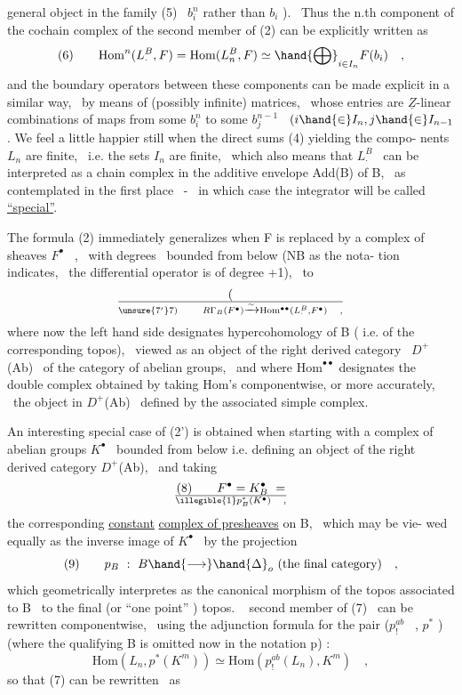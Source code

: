general object in the family (5) \ $b_i^n$ rather than $b_i$ ). \ Thus the n.th
component of the cochain complex of the second member of (2) can be
explicitly written as
\[ (6) \qquad \mathrm{Hom}^n(L_\cdot^B,F) = \mathrm{Hom}(L_n^B,F) \simeq \hand{\bigoplus}_{i\in I_n} F(b_i) \quad , \]
and the boundary operators between these components can be made explicit
in a similar way, \ by means of (possibly infinite) matrices, \ whose entries
are $\underline{Z}$-linear combinations of maps from some $b_i^n$ to some $b_j^{n-1}$ \ $(i \hand{\in} I_n, j\hand{\in} I_{n-1}$.
We feel a little happier still when the direct sums (4) yielding the compo-%
nents $L_n$ are finite, \ i.e. the sets $I_n$ are finite, \ which also means that
$L_\cdot^B$ \ can be interpreted as a chain complex in the additive envelope Add(B)
of B, \ as contemplated in the first place \ - \ in which case the integrator
will be called \uline{``special''}.

The formula (2) immediately generalizes when F is replaced by a 
complex of sheaves $F^\bullet$ \ , \ with degrees \ bounded from below (NB as the nota-%
tion indicates, \ the differential operator is of degree +1), \ to
\[ (\over{\unsure{7'}}{7}) \qquad R\Gamma_B(F^\bullet) \xrightarrow{\sim} \mathrm{Hom}^{\bullet\bullet}(L_\cdot^B,F^\bullet) \quad , \]
where now the  left hand side designates hypercohomology of B ( i.e.
of the corresponding topos), \ viewed as an object of the right derived
category \ $D^+$(Ab) \ of the category of abelian groups, \ and where $\mathrm{Hom}^{\bullet\bullet}$
designates the double complex obtained by taking Hom's componentwise,
or more accurately, \ the object in $D^+$(Ab) \ defined by the associated simple
complex.

An interesting special case of (2') is obtained when starting with
a complex of abelian groups $K^\bullet$ \ bounded from below i.e. defining an object
of the right derived category $D^+$(Ab), \ and taking
\[ (8) \qquad F^\bullet = K_B^\bullet \ = \over{\illegible{1}}{p}{}_B^*(K^\bullet) \quad , \]
the corresponding \uline{constant} \uline{complex of presheaves} on B, \ which may be vie-%
wed equally as the inverse image of $K^\bullet$ \ by the projection
\[ (9) \qquad p_B \ : \ B \hand{\longrightarrow} \hand{\Delta}_o \ \text{(the final category)} \quad , \]
which geometrically interpretes as the canonical morphism of the topos
associated to  B \ to the final (or ``one point'' ) topos. \  second
member of (7) \ can be rewritten componentwise, \ using the adjunction
formula for the pair ($p_!^{ab}$ \ , $p^*$ ) (where the qualifying B is omitted now in
the notation p) :
\[ \mathrm{Hom}(L_n,p^*(K^m)) \simeq \mathrm{Hom}(p_!^{ab}(L_n),K^m) \quad , \]
so that (7) can be rewritten \ as

